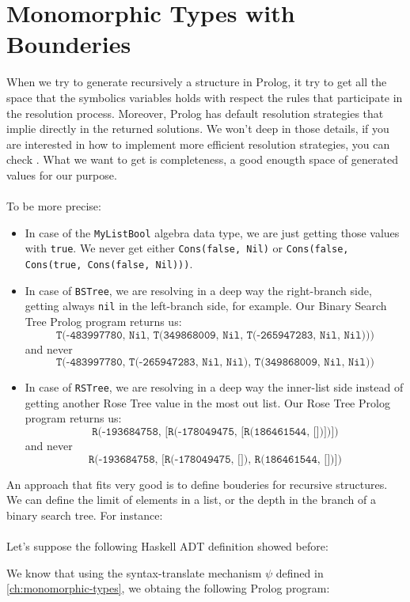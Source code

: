 \documentclass{report}
\theoremstyle{definition}
\theoremstyle{definition}
\newcommand{\ttt}[1]{\texttt{#1}}
\begin{document}
\section{Monomorphic Types with Bounderies}

When we try to generate recursively a structure in Prolog, it try to get all the space that the symbolics variables holds with respect the rules that participate in the resolution process. Moreover, Prolog has default resolution strategies that implie directly in the returned solutions. We won't deep in those details, if you are interested in how to implement more efficient resolution strategies, you can check \cite{effgenttransf}. What we want to get is completeness, a good enougth space of generated values for our purpose.\\\\
To be more precise:
\begin{itemize}
	\item In case of the \ttt{MyListBool} algebra data type, we are just getting those values with \ttt{true}. We never get either \ttt{Cons(false, Nil)} or \ttt{Cons(false, Cons(true, Cons(false, Nil)))}.
	\item In case of \ttt{BSTree}, we are resolving in a deep way the right-branch side, getting always \ttt{nil} in the left-branch side, for example. Our Binary Search Tree Prolog program returns us: $$\ttt{T(-483997780, Nil, T(349868009, Nil, T(-265947283, Nil, Nil)))}$$ and never $$\ttt{T(-483997780, T(-265947283, Nil, Nil), T(349868009, Nil, Nil))}$$
	\item In case of \ttt{RSTree}, we are resolving in a deep way the inner-list side instead of getting another Rose Tree value in the most out list. Our Rose Tree Prolog program returns us: $$\ttt{R(-193684758, [R(-178049475, [R(186461544, [])])])}$$ and never $$\ttt{R(-193684758, [R(-178049475, []), R(186461544, [])])}$$
\end{itemize}
An approach that fits very good is to define bouderies for recursive structures. We can define the limit of elements in a list, or the depth in the branch of a binary search tree. For instance:\\\\
Let's suppose the following Haskell ADT definition showed before:

We know that using the syntax-translate mechanism $\psi$ defined in \ref{ch:monomorphic-types}, we obtaing the following Prolog program:
\end{document}
